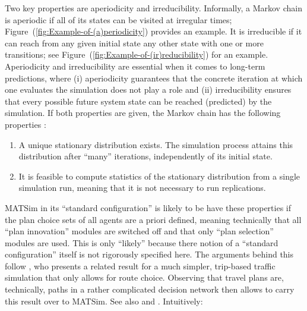 Two key properties are aperiodicity and irreducibility. Informally,
a Markov chain is aperiodic if all of its states can be visited at
irregular times; Figure~(\ref{fig:Example-of-(a)periodicity}) provides
an example. It is irreducible if it can reach from any given initial
state any other state with one or more transitions; see Figure~(\ref{fig:Example-of-(ir)reducibility})
for an example. Aperiodicity and irreducibility are essential when
it comes to long-term predictions, where (i) aperiodicity guarantees
that the concrete iteration at which one evaluates the simulation
does not play a role and (ii) irreducibility ensures that every possible
future system state can be reached (predicted) by the simulation.
If both properties are given, the Markov chain has the following properties
\citep{ross-2006}:
\begin{enumerate}
\item A unique stationary distribution exists. The simulation process attains
this distribution after {}``many'' iterations, independently of
its initial state.
\item It is feasible to compute statistics of the stationary distribution
from a single simulation run, meaning that it is not necessary to
run replications.
\label{it:self-averaging}
\end{enumerate}
MATSim in its {}``standard configuration'' is likely to be have
these properties if the plan choice sets of all agents are a priori
defined, meaning technically that all {}``plan innovation'' modules
are switched off and that only {}``plan selection'' modules are
used. This is only {}``likely'' because there notion of a {}``standard
configuration'' itself is not rigorously specified here. The arguments
behind this follow \citet{cascetta-1989}, who presents a related
result for a much simpler, trip-based traffic simulation that only
allows for route choice. Observing that travel plans are, technically,
paths in a rather complicated decision network then allows to carry
this result over to MATSim. See also \citet{NagelEtc2000tristan-succ} and \citep{floetteroed-2010e}.
Intuitively:
